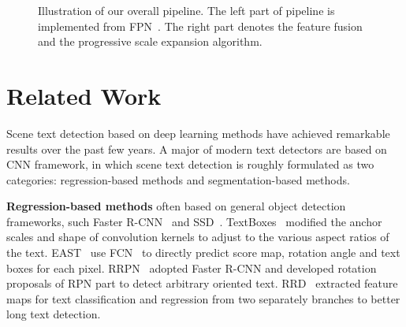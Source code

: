 \documentclass[10pt,twocolumn,letterpaper]{article}
\begin{document}
	\begin{figure}[t]
		\centering
		\setlength{\fboxrule}{0pt}
		\caption{Illustration of our overall pipeline. The left part of pipeline is implemented from FPN~\cite{lin2017feature}. The right part denotes the feature fusion and the progressive scale expansion algorithm.}
		\label{fig:pipeline}
	\end{figure}
	
	\section{Related Work}
	Scene text detection based on deep learning methods have achieved remarkable results over the past few years. A major of modern text detectors are based on CNN framework, in which scene text detection is roughly formulated as two categories: regression-based methods and segmentation-based methods.
	
	\textbf{Regression-based methods} often based on general object detection frameworks, such Faster R-CNN~\cite{ren2015faster} and SSD~\cite{liu2016ssd}.
	TextBoxes~\cite{liao2017textboxes} modified the anchor scales and shape of convolution kernels to adjust to the various aspect ratios of the text.
	EAST~\cite{zhou2017east} use FCN~\cite{FCN} to directly predict score map, rotation angle and text boxes for each pixel.
	RRPN~\cite{rrpn} adopted Faster R-CNN and developed rotation proposals of RPN part to detect arbitrary oriented text. 
	RRD~\cite{rrd} extracted feature maps for text classification and regression from two separately branches to better long text detection.
	
\end{document}
